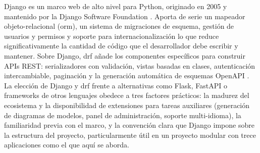 Django es un marco web de alto nivel para Python, originado en 2005 y
mantenido por la Django Software Foundation \cite{django}. Aporta de serie
un mapeador objeto-relacional (\acs{orm}), un sistema de migraciones de
esquema, gestión de usuarios y permisos y soporte para internacionalización
lo que reduce significativamente la cantidad de código que el desarrollador debe
escribir y mantener. Sobre Django, \ac{drf} añade los componentes
específicos para construir APIs REST: serializadores con validación,
vistas basadas en clases, autenticación intercambiable, paginación y la
generación automática de esquemas OpenAPI \cite{drf}. La elección de
Django y \acs{drf} frente a alternativas como Flask, FastAPI o frameworks
de otros lenguajes obedece a tres factores prácticos: la madurez del
ecosistema y la disponibilidad de extensiones para tareas auxiliares
(generación de diagramas de modelos, panel de administración, soporte
multi-idioma), la familiaridad previa con el marco, y la
convención clara que Django impone sobre la estructura del proyecto,
particularmente útil en un proyecto modular con trece aplicaciones como
el que aquí se aborda.
